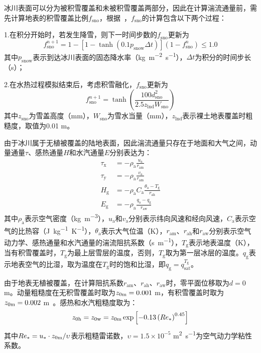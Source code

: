 冰川表面可以分为被积雪覆盖和未被积雪覆盖两部分，因此在计算湍流通量前，需先计算地表的积雪覆盖比例$f_{\mathrm{sno}}$，根据~\citet{swenson2012new}，$f_{\mathrm{sno}}$的计算包含以下两个过程：

1.在积分开始时，若发生降雪，则下一时间步数的$f_{\mathrm{sno}}$更新为
\begin{equation}
  f^{n+1}_{\mathrm{sno}}=1-\left[1-\tanh{\left(0.1 p_{\mathrm {snow}}  \Delta t\right)}\right]\left(1-f^n_{\mathrm{sno}}\right) \leqslant 1.0
\end{equation}
其中$p_{\mathrm {snow}} $表示到达冰川表面的固态降水率（\unit{kg.m^{-2}.s^{-1}}），$\Delta t$为积分的时间步长（s）；

2.在水热过程模拟结束后，考虑积雪融化，$f_{\mathrm{sno}}$更新为
\begin{equation}
  f^{n+1}_{\mathrm{sno}}=\tanh \left(\frac{100 d^2_{\mathrm{sno}}}{2.5z_{\mathrm {lnd}} W_{\mathrm{sno}}}\right)
\end{equation}
其中$z_{\mathrm{sno}}$为雪盖高度（mm），$W_{\mathrm{sno}}$为雪水当量（mm），$z_{\mathrm {lnd}}$表示裸土地表覆盖时粗糙度，取值为0.01 m。


由于冰川属于无植被覆盖的陆地表面，因此湍流通量只存在于地面和大气之间，动量通量$\tau$、感热通量$H$和水汽通量$E$分别表达为：
\begin{align}
  \tau_{\mathrm {x}}  &= -\rho_{\mathrm{a}} \frac{u_{\mathrm{a}}}{r_{\mathrm{am}}} \\
  \tau_{\mathrm {y}}  &= -\rho_{\mathrm{a}} \frac{v_{\mathrm{a}}}{r_{\mathrm{am}}} \\
  H_{\mathrm {g}}  &= -\rho_{\mathrm{a}} C_{\mathrm{a}} \frac{\theta_{\mathrm{a}}-T_{\mathrm {g}} }{r_{\mathrm{ah}}} \\
  E_{\mathrm {g}}  &= -\rho_{\mathrm{a}} \frac{q_{\mathrm{a}}-q_{\mathrm {g}} }{r_{\mathrm{aw}}}
\end{align}
其中$\rho_{\mathrm{a}}$表示空气密度（\unit{kg.m^{-3}}），$u_{\mathrm{a}}$和$v_{\mathrm{a}}$分别表示纬向风速和经向风速，$C_{\mathrm{a}}$表示空气的比热容（\unit{J.kg^{-1}.K^{-1}}），$\theta_{\mathrm{a}}$表示大气位温（K），$r_{\mathrm{am}}$、$r_{\mathrm{ah}}$和$r_{\mathrm{aw}}$分别表示空气动力学、感热通量和水汽通量的湍流阻抗系数（\unit{s.m^{-1}}），$T_{\mathrm {g}} $表示地表温度（K），当有积雪覆盖时，$T_{\mathrm {g}} $为最上层雪层的温度，否则，$T_{\mathrm {g}} $取为第一层冰层的温度。$q_{\mathrm {g}} $表示地表空气的比湿，取为温度在$T_{\mathrm {g}} $时的饱和比湿，即$q_{\mathrm {g}} =q^{T_{\mathrm {g}} }_{\mathrm{sat}}$。

由于地表无植被覆盖，在计算阻抗系数$r_{\mathrm{am}}$、$r_{\mathrm{ah}}$、$r_{\mathrm{aw}}$时，零平面位移取为$d=0$ m。动量粗糙度在无积雪覆盖时取为$z_{\rm 0m}=0.001$ m，有积雪覆盖时取为$z_{\rm 0m}=0.002$ m~\citep{brock_willis_sharp_2006}。感热和水汽粗糙度取为：
\begin{equation}z_{\rm 0h}=z_{\rm 0w}=z_{\rm 0m}\exp{\left[-0.13\left(Re_*\right)^{0.45}\right]}
\end{equation}
其中$Re_*=u_*\cdot z_{\rm 0m}/\upsilon$表示粗糙雷诺数，$\upsilon= 1.5 \times 10^{-5}$ \unit{m^2.s^{-1}}为空气动力学粘性系数。

